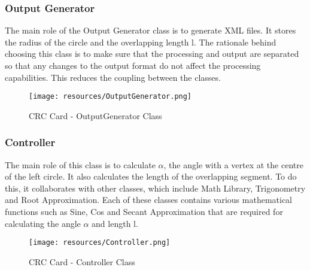     \subsubsection{Output Generator}
      \parbox{1.0\linewidth}{
        The main role of the Output Generator class is to generate XML files. It stores the radius of the circle and the overlapping length l. The rationale behind choosing this class is to make sure that the processing and output are separated so that any changes to the output format do not affect the processing capabilities. This reduces the coupling between the classes.
      }
      \vspace*{2em}
      \begin{figure}[h!]
        \centering
        \texttt{[image: resources/OutputGenerator.png]}
        \caption{CRC Card - OutputGenerator Class}\label{fig:output}
      \end{figure}

    \subsubsection{Controller}
      \parbox{1.0\linewidth}{
        The main role of this class is to calculate $\alpha$, the angle with a vertex at the centre of the left circle. It also calculates the length of the overlapping segment. To do this, it collaborates with other classes, which include Math Library, Trigonometry and Root Approximation. Each of these classes contains various mathematical functions such as Sine, Cos and Secant Approximation that are required for calculating the angle $\alpha$ and length l.
      }
      \vspace*{2em}
      \begin{figure}[h!]
        \centering
        \texttt{[image: resources/Controller.png]}
        \caption{CRC Card - Controller Class}\label{fig:control}
      \end{figure}

